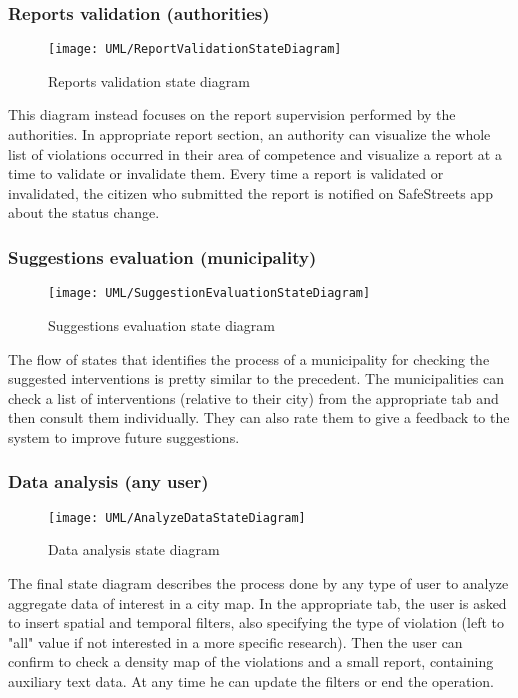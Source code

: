 \subsubsection{Reports validation (authorities)}

\begin{figure}[H]
	\centering
	\texttt{[image: UML/ReportValidationStateDiagram]}
	\caption{Reports validation state diagram}
\end{figure}

This diagram instead focuses on the report supervision performed by the authorities. In appropriate report section, an authority can visualize the whole list of violations occurred in their area of competence and visualize a report at a time to validate or invalidate them. Every time a report is validated or invalidated, the citizen who submitted the report is notified on SafeStreets app about the status change.

\subsubsection{Suggestions evaluation (municipality)}

\begin{figure}[H]
	\centering
	\texttt{[image: UML/SuggestionEvaluationStateDiagram]}
	\caption{Suggestions evaluation state diagram}
\end{figure}

The flow of states that identifies the process of a municipality for checking the suggested interventions is pretty similar to the precedent. The municipalities can check a list of interventions (relative to their city) from the appropriate tab and then consult them individually. They can also rate them to give a feedback to the system to improve future suggestions.

\subsubsection{Data analysis (any user)}

\begin{figure}[H]
	\centering
	\texttt{[image: UML/AnalyzeDataStateDiagram]}
	\caption{Data analysis state diagram}
\end{figure}

The final state diagram describes the process done by any type of user to analyze aggregate data of interest in a city map. In the appropriate tab, the user is asked to insert spatial and temporal filters, also specifying the type of violation (left to "all" value if not interested in a more specific research). Then the user can confirm to check a density map of the violations and a small report, containing auxiliary text data. At any time he can update the filters or end the operation.